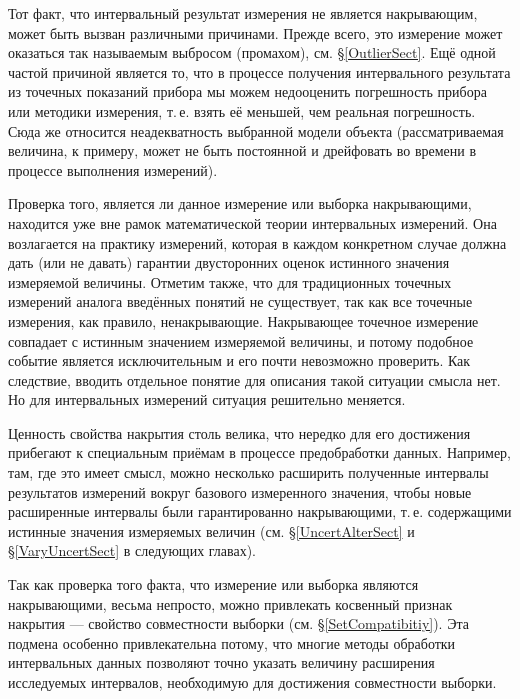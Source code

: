 \documentclass[a5paper,openany]{book}
\begin{document}
Тот факт, что интервальный результат измерения не является накрывающим, может быть 
вызван различными причинами. Прежде всего, это измерение может оказаться так называемым 
выбросом (промахом), см. \S\ref{OutlierSect}. Ещё одной частой причиной является то, что 
в процессе получения интервального результата из точечных показаний прибора мы можем  
недооценить погрешность прибора или методики измерения, т.\,е. взять её меньшей, чем 
реальная погрешность. Сюда же относится неадекватность выбранной модели объекта 
(рассматриваемая величина, к примеру, может не быть постоянной и дрейфовать во времени 
в процессе выполнения измерений). 
  
Проверка того, является ли данное измерение или выборка накрывающими, находится уже 
вне рамок математической теории интервальных измерений. Она возлагается на практику 
измерений, которая в каждом конкретном случае должна дать (или не давать) гарантии 
двусторонних оценок истинного значения измеряемой величины. Отметим также, что 
для традиционных точечных измерений аналога введённых понятий не существует, так как 
все точечные измерения, как правило, ненакрывающие. Накрывающее точечное измерение 
совпадает с истинным значением измеряемой величины, и потому подобное событие 
является исключительным и его почти невозможно проверить. Как следствие, вводить 
отдельное понятие для описания такой ситуации смысла нет. Но для интервальных 
измерений ситуация решительно меняется. 
  
Ценность свойства накрытия столь велика, что нередко для его достижения прибегают 
к специальным приёмам в процессе предобработки данных. Например, там, где это имеет 
смысл, можно несколько расширить полученные интервалы результатов измерений вокруг 
базового измеренного значения, чтобы новые расширенные интервалы были гарантированно 
накрывающими, т.\,е. содержащими истинные значения измеряемых величин (см. 
\S\ref{UncertAlterSect} и \S\ref{VaryUncertSect} в следующих главах). 
  
Так как проверка того факта, что измерение или выборка являются накрывающими, 
весьма непросто, можно привлекать косвенный признак накрытия --- свойство совместности 
выборки (см. \S\ref{SetCompatibitiy}). Эта подмена особенно привлекательна потому, 
что многие методы обработки интервальных данных позволяют точно указать величину 
расширения исследуемых интервалов, необходимую для достижения совместности выборки. 
  
  
\end{document}
